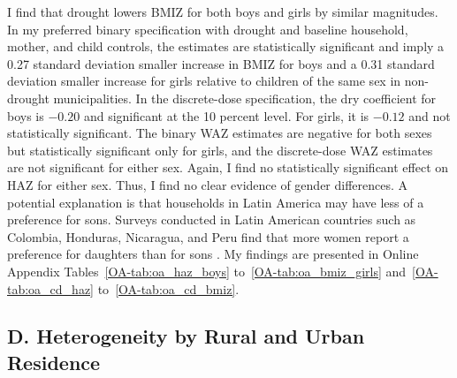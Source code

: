 \documentclass[12pt]{article}
\begin{document}
I find that drought lowers BMIZ for both boys and girls by similar magnitudes. In my preferred binary specification with drought and baseline household, mother, and child controls, the estimates are statistically significant and imply a 0.27 standard deviation smaller increase in BMIZ for boys and a 0.31 standard deviation smaller increase for girls relative to children of the same sex in non-drought municipalities. In the discrete-dose specification, the dry coefficient for boys is $-0.20$ and significant at the 10 percent level. For girls, it is $-0.12$ and not statistically significant. The binary WAZ estimates are negative for both sexes but statistically significant only for girls, and the discrete-dose WAZ estimates are not significant for either sex. Again, I find no statistically significant effect on HAZ for either sex. Thus, I find no clear evidence of gender differences. A potential explanation is that households in Latin America may have less of a preference for sons. Surveys conducted in Latin American countries such as Colombia, Honduras, Nicaragua, and Peru find that more women report a preference for daughters than for sons \parencite{fuseVariationsAttitudinalGender2010}. My findings are presented in Online Appendix Tables~\ref{OA-tab:oa_haz_boys} to~\ref{OA-tab:oa_bmiz_girls} and~\ref{OA-tab:oa_cd_haz} to~\ref{OA-tab:oa_cd_bmiz}.

\subsection*{D. Heterogeneity by Rural and Urban Residence}
\end{document}
